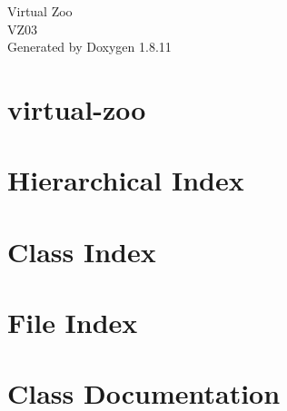 \documentclass[twoside]{book}
\newcommand{\+}{\discretionary{\mbox{\scriptsize$\hookleftarrow$}}{}{}}
\newcommand{\clearemptydoublepage}{%
  \newpage{\pagestyle{empty}\cleardoublepage}%
}
\begin{document}
\hypersetup{pageanchor=false,
             bookmarksnumbered=true,
             pdfencoding=unicode
            }
\begin{titlepage}
\vspace*{7cm}
\begin{center}%
{\Large Virtual Zoo \\[1ex]\large V\+Z03 }\\
\vspace*{1cm}
{\large Generated by Doxygen 1.8.11}\\
\end{center}
\end{titlepage}
\clearemptydoublepage
\tableofcontents
\clearemptydoublepage
{}
\hypersetup{pageanchor=true}

\chapter{virtual-\/zoo}
\label{md_README}
\hypertarget{md_README}{}

\chapter{Hierarchical Index}

\chapter{Class Index}

\chapter{File Index}

\chapter{Class Documentation}





















































\end{document}
